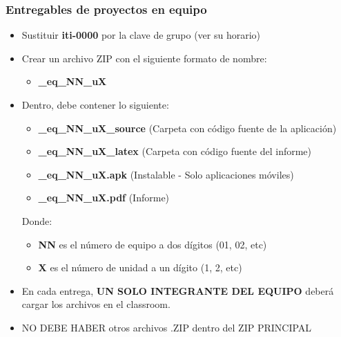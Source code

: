 \begin{frame}
\frametitle{Entregables de proyectos en equipo}
    \begin{itemize}
    \item Sustituir \textbf{iti-0000} por la clave de grupo (ver su horario) 
    \item Crear un archivo ZIP con el siguiente formato de nombre:
    \begin{itemize}
        \item \textbf{\clavegrupo\_eq\_NN\_uX}
    \end{itemize}
    \item Dentro, debe contener lo siguiente:
\begin{itemize}
\item \textbf{\clavegrupo\_eq\_NN\_uX\_source} (Carpeta con c\'odigo fuente de la aplicaci\'on)
\item \textbf{\clavegrupo\_eq\_NN\_uX\_latex} (Carpeta con c\'odigo fuente del informe)
\item \textbf{\clavegrupo\_eq\_NN\_uX.apk} (Instalable - Solo aplicaciones móviles)
\item \textbf{\clavegrupo\_eq\_NN\_uX.pdf} (Informe)
\end{itemize}
Donde:
\begin{itemize}
\item \textbf{NN} es el n\'umero de equipo a dos d\'igitos (01, 02, etc)
\item \textbf{X} es el n\'umero de unidad a un d\'igito (1, 2, etc)
\end{itemize}
\item \scriptsize{En cada entrega, \textbf{UN SOLO INTEGRANTE DEL EQUIPO} deberá cargar los archivos en el classroom.}
\item \scriptsize{NO DEBE HABER otros archivos .ZIP dentro del ZIP PRINCIPAL}
\end{itemize}


\end{frame}




